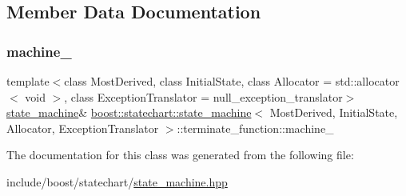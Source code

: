 \subsection{Member Data Documentation}
\mbox{\label{classboost_1_1statechart_1_1state__machine_1_1terminate__function_a55aa5484f0cfd3516967e91b34653ae6}} 
\subsubsection{\texorpdfstring{machine\+\_\+}{machine\_}}
{\footnotesize\ttfamily template$<$class Most\+Derived, class Initial\+State, class Allocator = std\+::allocator$<$ void $>$, class Exception\+Translator = null\+\_\+exception\+\_\+translator$>$ \\
\mbox{\hyperlink{classboost_1_1statechart_1_1state__machine}{state\+\_\+machine}}\& \mbox{\hyperlink{classboost_1_1statechart_1_1state__machine}{boost\+::statechart\+::state\+\_\+machine}}$<$ Most\+Derived, Initial\+State, Allocator, Exception\+Translator $>$\+::terminate\+\_\+function\+::machine\+\_\+\hspace{0.3cm}{\ttfamily [private]}}



The documentation for this class was generated from the following file\+:\begin{DoxyCompactItemize}
\item 
include/boost/statechart/\mbox{\hyperlink{state__machine_8hpp}{state\+\_\+machine.\+hpp}}\end{DoxyCompactItemize}
